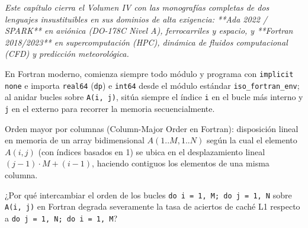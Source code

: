 \documentclass{book}
\begin{document}
\noindent\textit{Este capítulo cierra el Volumen IV con las monografías completas de dos lenguajes insustituibles en sus dominios de alta exigencia: **Ada 2022 / SPARK** en aviónica (DO-178C Nivel A), ferrocarriles y espacio, y **Fortran 2018/2023** en supercomputación (HPC), dinámica de fluidos computacional (CFD) y predicción meteorológica.}

\begin{tcolorbox}[title={Consejo}, studiumtip, breakable]

En Fortran moderno, comienza siempre todo módulo y programa con \texttt{implicit none} e importa \texttt{real64} (\texttt{dp}) e \texttt{int64} desde el módulo estándar \texttt{iso\_fortran\_env}; al anidar bucles sobre \texttt{A(i, j)}, sitúa siempre el índice \texttt{i} en el bucle más interno y \texttt{j} en el externo para recorrer la memoria secuencialmente.
\end{tcolorbox}

\begin{tcolorbox}[title={Definición}, studiumdef, breakable]

Orden mayor por columnas (Column-Major Order en Fortran): disposición lineal en memoria de un array bidimensional \(A(1..M, 1..N)\) según la cual el elemento \(A(i, j)\) (con índices basados en 1) se ubica en el desplazamiento lineal \((j - 1) \cdot M + (i - 1)\), haciendo contiguos los elementos de una misma columna.
\end{tcolorbox}

\begin{tcolorbox}[title={Autoficha}, studiumcheck, breakable]

¿Por qué intercambiar el orden de los bucles \texttt{do i = 1, M; do j = 1, N} sobre \texttt{A(i, j)} en Fortran degrada severamente la tasa de aciertos de caché L1 respecto a \texttt{do j = 1, N; do i = 1, M}?
\end{tcolorbox}
\end{document}
